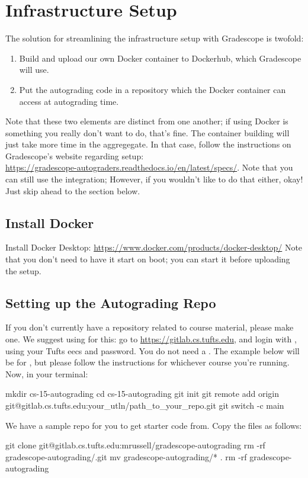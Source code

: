 \documentclass[11pt]{report}
\begin{document}
\chapter*{Infrastructure Setup}
The solution for streamlining the infrastructure setup with Gradescope is twofold:
\begin{enumerate}
      \item Build and upload our own Docker container to Dockerhub, which Gradescope will use.
      \item Put the autograding code in a  repository which the Docker container can access at autograding time. 
\end{enumerate}
Note that these two elements are distinct from one another; if using Docker is something you really don't want to do, that's fine. The container building 
will just take more time in the aggregegate. In that case, follow the instructions on Gradescope's website regarding 
setup:\\ \textcolor{blue}{\href{https://gradescope-autograders.readthedocs.io/en/latest/specs/}{https://gradescope-autograders.readthedocs.io/en/latest/specs/}}.
Note that you can still use the  integration;  However, if you wouldn't like to do that either, okay! Just skip ahead to the  section below. 

\section*{Install Docker}
Install Docker Desktop: \textcolor{blue}{\href{https://www.docker.com/products/docker-desktop/}{https://www.docker.com/products/docker-desktop/}}
Note that you don't need to have it start on boot; you can start it before uploading the setup. 

\section*{Setting up the Autograding Repo}
If you don't currently have a repository related to course material, please make one. We suggest using
 for this: go to \textcolor{blue}{\href{https://gitlab.cs.tufts.edu}{https://gitlab.cs.tufts.edu}}, and 
login with , using your Tufts eecs  and password. You do not need a .
The example below will be for , but please follow the instructions for whichever course you're running.
Now, in your terminal:
\begin{bashcodeblock}
mkdir cs-15-autograding
cd cs-15-autograding
git init
git remote add origin git@gitlab.cs.tufts.edu:your_utln/path_to_your_repo.git
git switch -c main 
\end{bashcodeblock}
We have a sample repo for you to get starter code from. Copy the files as follows:
\begin{bashcodeblock}
git clone git@gitlab.cs.tufts.edu:mrussell/gradescope-autograding
rm -rf gradescope-autograding/.git
mv gradescope-autograding/* .
rm -rf gradescope-autograding
\end{bashcodeblock}
\end{document}
